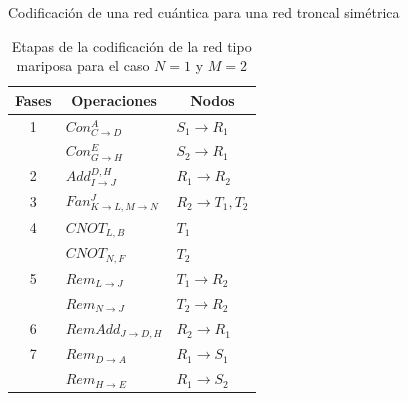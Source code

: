 \documentclass[10pt]{beamer}
\begin{document}
\begin{frame}{Codificación de una red cuántica para una red troncal simétrica}

  \begin{table}
    \caption{Etapas de la codificación de la red tipo mariposa para el caso $N=1$ y $M=2$}
    \begin{tabular}{|c|l|l|}
      \hline
      Fases & \multicolumn{1}{c|}{Operaciones}             & \multicolumn{1}{c|}{Nodos}  \\ \hline
      1     & $Con^A_{C \rightarrow D}$                    & $S_1  \rightarrow R_1$      \\
            & $Con^E_{G  \rightarrow H}$                   & $S_2  \rightarrow R_1$      \\ \hline
      2     & $Add^{D,H}_{I  \rightarrow J}$               & $R_1  \rightarrow R_2$      \\ \hline
      3     & $Fan^J_{K  \rightarrow L, M  \rightarrow N}$ & $R_2  \rightarrow T_1, T_2$ \\ \hline
      4     & $CNOT_{L,B}$                                 & $T_1$                       \\
            & $CNOT_{N,F}$                                 & $T_2$                       \\ \hline
      5     & $Rem_{L  \rightarrow J}$                     & $T_1  \rightarrow R_2$      \\
            & $Rem_{N  \rightarrow J}$                     & $T_2  \rightarrow R_2$      \\ \hline
      6     & $RemAdd_{J  \rightarrow D,H}$                & $R_2  \rightarrow R_1$      \\ \hline
      7     & $Rem_{D  \rightarrow A}$                     & $R_1  \rightarrow S_1$      \\
            & $Rem_{H  \rightarrow E}$                     & $R_1  \rightarrow S_2$      \\ \hline
    \end{tabular}
    \vspace{-0.5cm}
  \end{table}

\end{frame}
\end{document}
